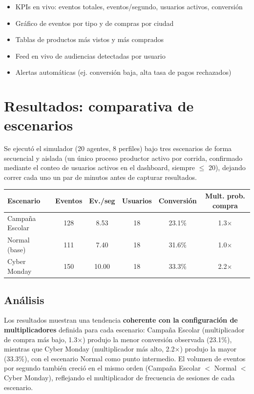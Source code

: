 \documentclass[11pt,a4paper]{article}
\begin{document}
\begin{itemize}[nosep]
\item KPIs en vivo: eventos totales, eventos/segundo, usuarios activos, conversión
\item Gráfico de eventos por tipo y de compras por ciudad
\item Tablas de productos más vistos y más comprados
\item Feed en vivo de audiencias detectadas por usuario
\item Alertas automáticas (ej. conversión baja, alta tasa de pagos rechazados)
\end{itemize}

\section{Resultados: comparativa de escenarios}

Se ejecutó el simulador (20 agentes, 8 perfiles) bajo tres escenarios de
forma secuencial y aislada (un único proceso productor activo por
corrida, confirmado mediante el conteo de usuarios activos en el
dashboard, siempre $\leq$ 20), dejando correr cada uno un par de minutos
antes de capturar resultados.

\begin{center}
\begin{tabular}{@{}lccccc@{}}
\toprule
\textbf{Escenario} & \textbf{Eventos} & \textbf{Ev./seg} & \textbf{Usuarios} & \textbf{Conversión} & \textbf{Mult. prob. compra} \\
\midrule
Campaña Escolar & 128 & 8.53 & 18 & 23.1\% & 1.3$\times$ \\
Normal (base) & 111 & 7.40 & 18 & 31.6\% & 1.0$\times$ \\
Cyber Monday & 150 & 10.00 & 18 & 33.3\% & 2.2$\times$ \\
\bottomrule
\end{tabular}
\end{center}

\subsection{Análisis}

Los resultados muestran una tendencia \textbf{coherente con la
configuración de multiplicadores} definida para cada escenario: Campaña
Escolar (multiplicador de compra más bajo, 1.3$\times$) produjo la menor
conversión observada (23.1\%), mientras que Cyber Monday (multiplicador
más alto, 2.2$\times$) produjo la mayor (33.3\%), con el escenario Normal
como punto intermedio. El volumen de eventos por segundo también creció
en el mismo orden (Campaña Escolar $<$ Normal $<$ Cyber Monday), reflejando
el multiplicador de frecuencia de sesiones de cada escenario.
\end{document}
